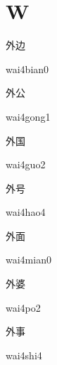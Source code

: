 ﻿%
\section*{W}
\begin{multicols*}{2}

\begin{verbete}{外边}
\begin{pronuncia}{wai4bian0}
\end{pronuncia}
\end{verbete}

\begin{verbete}{外公}
\begin{pronuncia}{wai4gong1}
\end{pronuncia}
\end{verbete}

\begin{verbete}{外国}
\begin{pronuncia}{wai4guo2}
\end{pronuncia}
\end{verbete}

\begin{verbete}{外号}
\begin{pronuncia}{wai4hao4}
\end{pronuncia}
\end{verbete}

\begin{verbete}{外面}
\begin{pronuncia}{wai4mian0}
\end{pronuncia}
\end{verbete}

\begin{verbete}[wai4po2]{外婆}
\begin{pronuncia}{wai4po2}
\end{pronuncia}
\end{verbete}

\begin{verbete}{外事}
\begin{pronuncia}{wai4shi4}
\end{pronuncia}
\end{verbete}


\end{multicols*}
